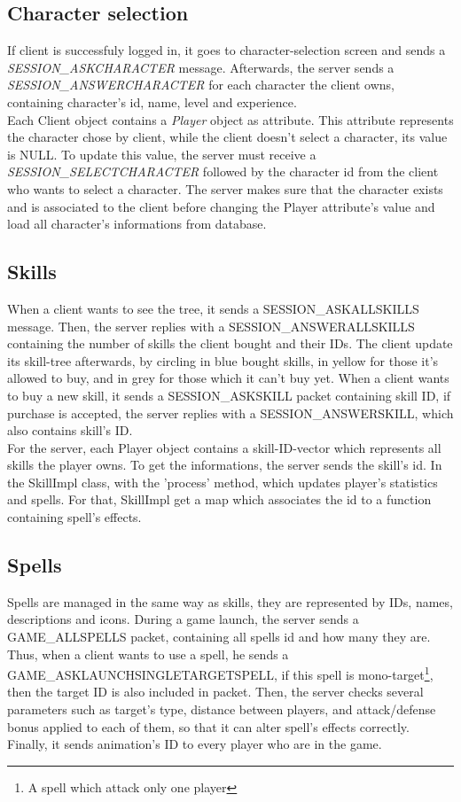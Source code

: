 \documentclass{scrreprt}
\begin{document}
				\subsection{Character selection}
				If client is successfuly logged in, it goes to character-selection screen and sends a \emph{SESSION\_ASKCHARACTER} message. Afterwards, the server sends a \emph{SESSION\_ANSWERCHARACTER} for each character the client owns, containing character's id, name, level and experience.\\
					Each Client object contains a \emph{Player} object as attribute. This attribute represents the character chose by client, while the client doesn't select a character, its value is NULL. To update this value, the server must receive a \emph{SESSION\_SELECTCHARACTER} followed by the character id from the client who wants to select a character. The server makes sure that the character exists and is associated to the client before changing the Player attribute's value and load all character's informations from database.

					\subsection{Skills}
					When a client wants to see the tree, it sends a SESSION\_ASKALLSKILLS message. Then, the server replies with a SESSION\_ANSWERALLSKILLS containing the number of skills the client bought and their IDs. The client update its skill-tree afterwards, by circling in blue bought skills, in yellow for those it's allowed to buy, and in grey for those which it can't buy yet.
					When a client wants to buy a new skill, it sends a SESSION\_ASKSKILL packet containing skill ID, if purchase is accepted, the server replies with a SESSION\_ANSWERSKILL, which also contains skill's ID.\\

					For the server, each Player object contains a skill-ID-vector which represents all skills the player owns. To get the informations, the server sends the skill's id. In the SkillImpl class, with the 'process' method, which updates player's statistics and spells. For that, SkillImpl get a map which associates the id to a function containing spell's effects.

					\subsection{Spells}
					Spells are managed in the same way as skills, they are represented by IDs, names, descriptions and icons. During a game launch, the server sends a GAME\_ALLSPELLS packet, containing all spells id and how many they are. Thus, when a client wants to use a spell, he sends a GAME\_ASKLAUNCHSINGLETARGETSPELL, if this spell is mono-target\footnote{A spell which attack only one player}, then the target ID is also included in packet. Then, the server checks several parameters such as target's type, distance between players, and attack/defense bonus applied to each of them, so that it can alter spell's effects correctly. Finally, it sends animation's ID to every player who are in the game.
\end{document}
